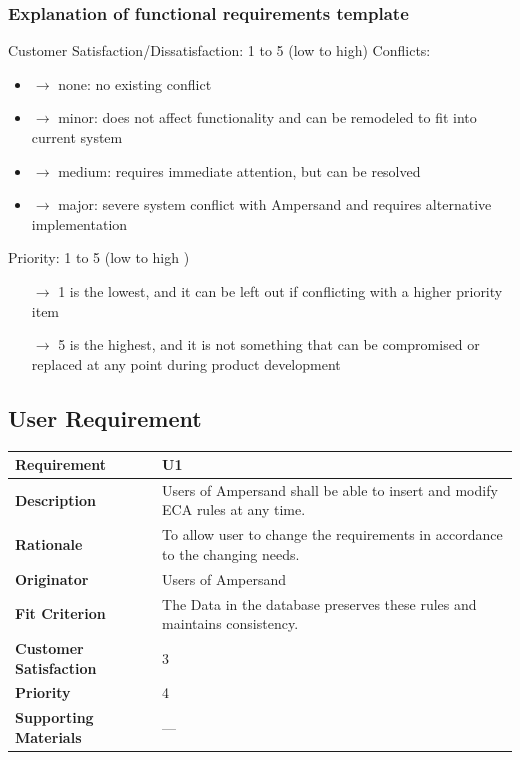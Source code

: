 \documentclass[12pt]{report}
\begin{document}
\subsubsection*{Explanation of functional requirements template}
%
%
Customer Satisfaction/Dissatisfaction: 1 to 5 (low to high) \newline
Conflicts: 
	\begin {itemize} 
	\item[$\rightarrow$] none: no existing conflict
	\item[$\rightarrow$] minor: does not affect functionality and can be remodeled to fit into 
	current system 
	\item[$\rightarrow$] medium: requires immediate attention, but can be resolved
	\item[$\rightarrow$] major: severe system conflict with Ampersand and requires alternative 
	implementation
	\end{itemize} 
Priority: 1 to 5 \big(low to high \big)
	\begin{itemize}
	\item[$\rightarrow$] 1 is the lowest, and it can be left out if conflicting with a higher 
	priority 
	item
	\item[$\rightarrow$] 5 is the highest, and it is not something that can be compromised or 
	replaced at any point during product development
	\end{itemize}



\subsection{User Requirement}

{\setlength{\tabcolsep}{12pt} %
\begin{tabularx}{\textwidth}{>{\bfseries}m{3cm}X}
Requirement & U1 \\ 
\midrule
\endhead
Description  & Users of Ampersand shall be able to insert and 
modify ECA rules at any time.  
\\	Rationale & To allow user to change the requirements in accordance to the changing needs.
\\	Originator & Users of Ampersand
\\	Fit Criterion & The Data in the database preserves these rules and maintains consistency.   
\\	Customer Satisfaction & 3 
\\	Priority & 4
\\	Supporting Materials & --- 
\vspace{12pt}
\end{tabularx}
}
\end{document}
